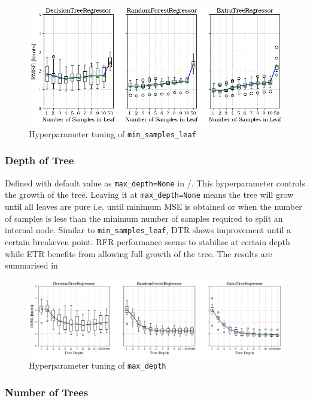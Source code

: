 \begin{figure}[h]
    \centering
        \includegraphics[width=.85\textwidth]{02_figures/hpo_min_samples_leaf.png}
        \caption{Hyperparameter tuning of {\tt min\_samples\_leaf}}
        \label{fig:hpo_min_samples_leaf}
\end{figure}

\subsubsection*{Depth of Tree}\label{sec:max_depth}

Defined with default value as {\tt max\_depth=None} in \scikit/. This hyperparameter controls the growth of the tree. Leaving it at {\tt max\_depth=None} means the tree will grow until all leaves are pure i.e. until minimum MSE is obtained or when the number of samples is less than the minimum number of samples required to split an internal node. Similar to {\tt min\_samples\_leaf}, DTR shows improvement until a certain breakeven point. RFR performance seems to stabilise at certain depth while ETR benefits from allowing full growth of the tree. The results are summarised in   

\begin{figure}[h]
    \centering
        \includegraphics[width=.95\textwidth]{02_figures/hpo_max_depth.png}
        \caption{Hyperparameter tuning of {\tt max\_depth}}
        \label{fig:hpo_max_depth}
\end{figure}

\subsubsection*{Number of Trees}\label{sec:n_estimators}

